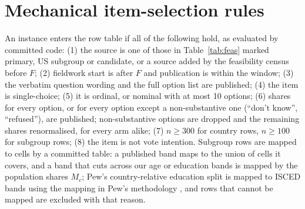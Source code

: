 \documentclass[11pt]{article}
\begin{document}
\section{Mechanical item-selection rules}
\label{app:selection}
An instance enters the row table if all of the following hold, as evaluated by committed code: (1) the source is one of those in Table~\ref{tab:feas} marked primary, US subgroup or candidate, or a source added by the feasibility census before $F$; (2) fieldwork start is after $F$ and publication is within the window; (3) the verbatim question wording and the full option list are published; (4) the item is single-choice; (5) it is ordinal, or nominal with at most 10 options; (6) shares for every option, or for every option except a non-substantive one (``don't know'', ``refused''), are published; non-substantive options are dropped and the remaining shares renormalised, for every arm alike; (7) $n\ge300$ for country rows, $n\ge100$ for subgroup rows; (8) the item is not vote intention. Subgroup rows are mapped to cells by a committed table: a published band maps to the union of cells it covers, and a band that cuts across our age or education bands is mapped by the population shares $M_c$; Pew's country-relative education split is mapped to ISCED bands using the mapping in Pew's methodology \citep{pew2026china}, and rows that cannot be mapped are excluded with that reason.
\end{document}

